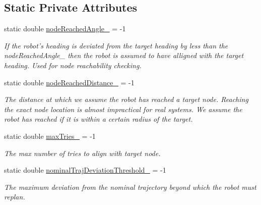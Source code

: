 \subsection*{\-Static \-Private \-Attributes}
\begin{DoxyCompactItemize}
\item 
\hypertarget{class_controller_a93ec5b0a3ae4e7229cb63f659e1b6e1d}{static double \hyperlink{class_controller_a93ec5b0a3ae4e7229cb63f659e1b6e1d}{node\-Reached\-Angle\-\_\-} = -\/1}\label{class_controller_a93ec5b0a3ae4e7229cb63f659e1b6e1d}

\begin{DoxyCompactList}\small\item\em \-If the robot's heading is deviated from the target heading by less than the node\-Reached\-Angle\-\_\- then the robot is assumed to have alligned with the target heading. \-Used for node reachability checking. \end{DoxyCompactList}\item 
\hypertarget{class_controller_a2688f277c2087c527c67eec19b2a3c70}{static double \hyperlink{class_controller_a2688f277c2087c527c67eec19b2a3c70}{node\-Reached\-Distance\-\_\-} = -\/1}\label{class_controller_a2688f277c2087c527c67eec19b2a3c70}

\begin{DoxyCompactList}\small\item\em \-The distance at which we assume the robot has reached a target node. \-Reaching the exact node location is almost impractical for real systems. \-We assume the robot has reached if it is within a certain radius of the target. \end{DoxyCompactList}\item 
\hypertarget{class_controller_a430b93daf349b2172311924d69b44c08}{static double \hyperlink{class_controller_a430b93daf349b2172311924d69b44c08}{max\-Tries\-\_\-} = -\/1}\label{class_controller_a430b93daf349b2172311924d69b44c08}

\begin{DoxyCompactList}\small\item\em \-The max number of tries to align with target node. \end{DoxyCompactList}\item 
\hypertarget{class_controller_a1999422f369674236a5ae9b83ef6a6b1}{static double \hyperlink{class_controller_a1999422f369674236a5ae9b83ef6a6b1}{nominal\-Traj\-Deviation\-Threshold\-\_\-} = -\/1}\label{class_controller_a1999422f369674236a5ae9b83ef6a6b1}

\begin{DoxyCompactList}\small\item\em \-The maximum deviation from the nominal trajectory beyond which the robot must replan. \end{DoxyCompactList}\end{DoxyCompactItemize}


